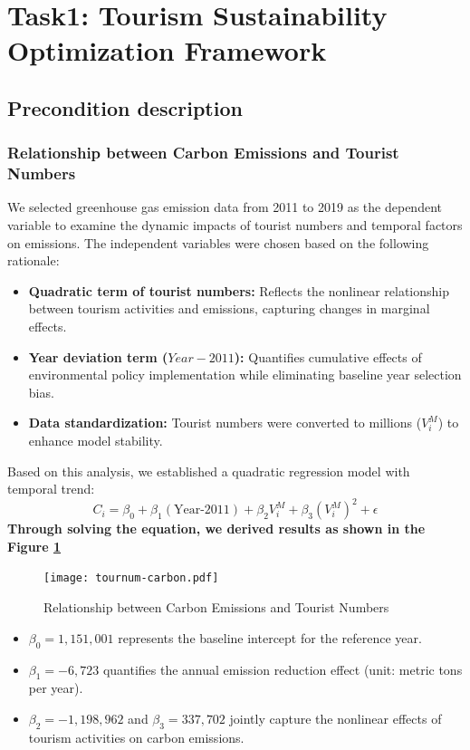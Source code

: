 \documentclass{mcmthesis}
\begin{document}
  
\section{Task1: Tourism Sustainability Optimization Framework}
\subsection{Precondition description}
\subsubsection{Relationship between Carbon Emissions and Tourist Numbers}
We selected greenhouse gas emission data from 2011 to 2019 as the dependent variable to examine the dynamic impacts of tourist numbers and temporal factors on emissions. The independent variables were chosen based on the following rationale:
\begin{itemize}
  \item \textbf{Quadratic term of tourist numbers:} Reflects the nonlinear relationship between tourism activities and emissions, capturing changes in marginal effects.
  \item \textbf{Year deviation term ($Year-2011$):} Quantifies cumulative effects of environmental policy implementation while eliminating baseline year selection bias.
  \item \textbf{Data standardization:} Tourist numbers were converted to millions ($V_i^M$) to enhance model stability.
\end{itemize}
Based on this analysis, we established a quadratic regression model with temporal trend:
\begin{equation}
  C_i = \beta_0 + \beta_1 (\text{Year-2011}) + \beta_2 V_i^M + \beta_3 \left( V_i^M \right)^2 + \epsilon 
\end{equation}
\textbf{Through solving the equation, we derived results as shown in the Figure \ref{fig:carbon}}
\begin{figure}[h!]
  \centering
  \texttt{[image: tournum-carbon.pdf]}
  \caption{Relationship between Carbon Emissions and Tourist Numbers}  %
  \label{fig:carbon}                   %
\end{figure}
\begin{itemize}
  \item $\beta_0 = 1,151,001$ represents the baseline intercept for the reference year.
  \item $\beta_1 = −6,723$ quantifies the annual emission reduction effect (unit: metric tons per year).
  \item $\beta_2 = −1,198,962$ and $\beta_3 = 337,702$ jointly capture the nonlinear effects of tourism activities on carbon emissions.
\end{itemize}
\end{document}
